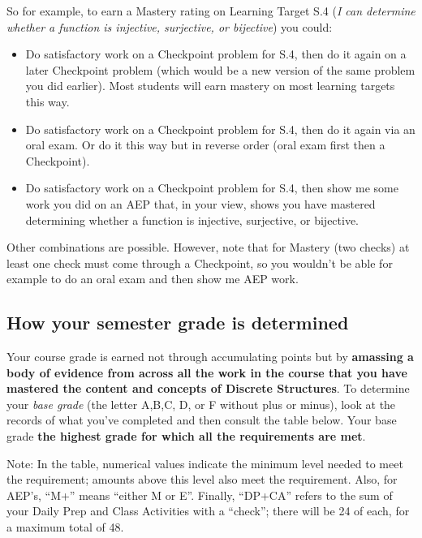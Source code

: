 \documentclass[]{article}
\providecommand{\tightlist}{%
  \setlength{\itemsep}{0pt}\setlength{\parskip}{0pt}}
\begin{document}
So for example, to earn a Mastery rating on Learning Target S.4 (\emph{I
can determine whether a function is injective, surjective, or
bijective}) you could:

\begin{itemize}
\tightlist
\item
  Do satisfactory work on a Checkpoint problem for S.4, then do it again
  on a later Checkpoint problem (which would be a new version of the
  same problem you did earlier). Most students will earn mastery on most
  learning targets this way.
\item
  Do satisfactory work on a Checkpoint problem for S.4, then do it again
  via an oral exam. Or do it this way but in reverse order (oral exam
  first then a Checkpoint).
\item
  Do satisfactory work on a Checkpoint problem for S.4, then show me
  some work you did on an AEP that, in your view, shows you have
  mastered determining whether a function is injective, surjective, or
  bijective.
\end{itemize}

Other combinations are possible. However, note that for Mastery (two
checks) at least one check must come through a Checkpoint, so you
wouldn't be able for example to do an oral exam and then show me AEP
work.

\hypertarget{how-your-semester-grade-is-determined}{%
\subsection{How your semester grade is
determined}\label{how-your-semester-grade-is-determined}}

Your course grade is earned not through accumulating points but by
\textbf{amassing a body of evidence from across all the work in the
course that you have mastered the content and concepts of Discrete
Structures}. To determine your \emph{base grade} (the letter A,B,C, D,
or F without plus or minus), look at the records of what you've
completed and then consult the table below. Your base grade \textbf{the
highest grade for which all the requirements are met}.

Note: In the table, numerical values indicate the minimum level needed
to meet the requirement; amounts above this level also meet the
requirement. Also, for AEP's, ``M+'' means ``either M or E''. Finally,
``DP+CA'' refers to the sum of your Daily Prep and Class Activities with
a ``check''; there will be 24 of each, for a maximum total of 48.
\end{document}
